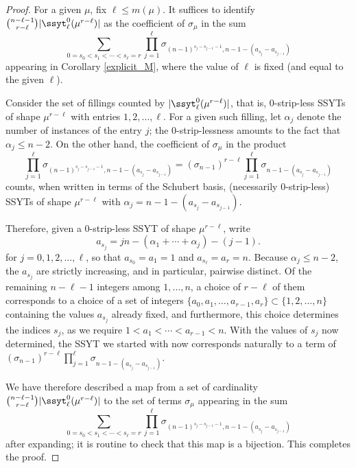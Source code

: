 \begin{proof}
For a given $\mu$, fix $\ell\le m(\mu)$. It suffices to identify $\binom{n-\ell-1}{r-\ell}|\ssyt^0_\ell(\mu^{r-\ell})|$ as the coefficient of $\sigma_\mu$ in the sum 
\begin{equation*}
\sum_{0=s_0<s_1<\cdots< s_\ell =r}\prod_{j=1}^{\ell}\sigma_{(n-1)^{s_j-s_{j-1}-1},n-1-(a_{s_j}-a_{s_{j-1}})}
\end{equation*}
appearing in Corollary \ref{explicit_M}, where the value of $\ell$ is fixed (and equal to the given $\ell$).

Consider the set of fillings counted by $|\ssyt^0_\ell(\mu^{r-\ell})|$, that is, 0-strip-less SSYTs of shape $\mu^{r-\ell}$ with entries $1,2,\ldots,\ell$. For a given such filling, let $\alpha_j$ denote the number of instances of the entry $j$; the 0-strip-lessness amounts to the fact that $\alpha_j\le n-2$. On the other hand, the coefficient of $\sigma_\mu$ in the product
\begin{equation*}
\prod_{j=1}^{\ell}\sigma_{(n-1)^{s_j-s_{j-1}-1},n-1-(a_{s_j}-a_{s_{j-1}})}=(\sigma_{n-1})^{r-\ell}\prod_{j=1}^{\ell}\sigma_{n-1-(a_{s_j}-a_{s_{j-1}})}
\end{equation*}
counts, when written in terms of the Schubert basis, (necessarily 0-strip-less) SSYTs of shape $\mu^{r-\ell}$ with $\alpha_j=n-1-(a_{s_j}-a_{s_{j-1}})$. 

Therefore, given a 0-strip-less SSYT of shape $\mu^{r-\ell}$, write
\begin{equation*}
a_{s_j}=jn-(\alpha_1+\cdots+\alpha_j)-(j-1).
\end{equation*}
for $j=0,1,2,\ldots,\ell$, so that $a_{s_0}=a_1=1$ and $a_{s_\ell}=a_r=n$. Because $\alpha_j\le n-2$, the $a_{s_j}$ are strictly increasing, and in particular, pairwise distinct. Of the remaining $n-\ell-1$ integers among $1,\ldots,n$, a choice of $r-\ell$ of them corresponds to a choice of a set of integers $\{a_0,a_1,\ldots,a_{r-1},a_r\}\subset\{1,2,\ldots,n\}$ containing the values $a_{s_j}$ already fixed, and furthermore, this choice determines the indices $s_j$, as we require $1<a_1<\cdots<a_{r-1}<n$. With the values of $s_j$ now determined, the SSYT we started with now corresponds naturally to a term of $(\sigma_{n-1})^{r-\ell}\prod_{j=1}^{\ell}\sigma_{n-1-(a_{s_j}-a_{s_{j-1}})}$.

We have therefore described a map from a set of cardinality $\binom{n-\ell-1}{r-\ell}|\ssyt^0_\ell(\mu^{r-\ell})|$ to the set of terms $\sigma_\mu$ appearing in the sum
\begin{equation*}
\sum_{0=s_0<s_1<\cdots< s_\ell =r}\prod_{j=1}^{\ell}\sigma_{(n-1)^{s_j-s_{j-1}-1},n-1-(a_{s_j}-a_{s_{j-1}})}
\end{equation*}
after expanding; it is routine to check that this map is a bijection. This completes the proof.
\end{proof}


